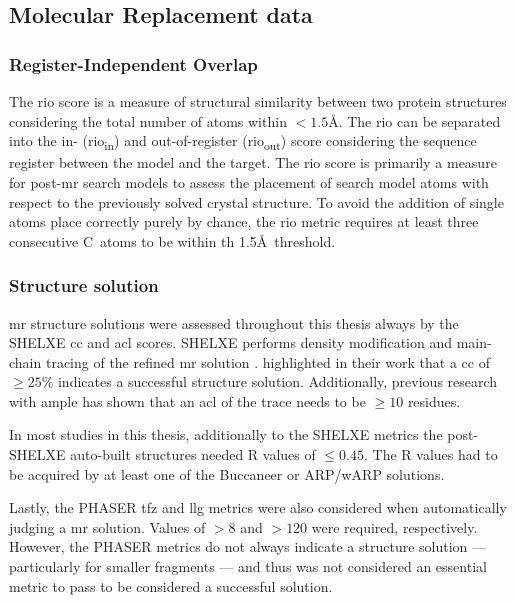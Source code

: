 \subsection{Molecular Replacement data}
\subsubsection{Register-Independent Overlap}
The \gls{rio} score \cite{Thomas2015-wu} is a measure of structural similarity between two protein structures considering the total number of atoms within $<1.5$\AA. The \gls{rio} can be separated into the in- (\gls{rio}\textsubscript{in}) and out-of-register (\gls{rio}\textsubscript{out}) score considering the sequence register between the model and the target. The \gls{rio} score is primarily a measure for post-\gls{mr} search models to assess the placement of search model atoms with respect to the previously solved crystal structure. To avoid the addition of single atoms place correctly purely by chance, the \gls{rio} metric requires at least three consecutive C\textalpha\ atoms to be within th 1.5\AA\ threshold.

\subsubsection{Structure solution} \label{sec:methods_mr_success}

\gls{mr} structure solutions were assessed throughout this thesis always by the SHELXE \gls{cc} and \gls{acl} scores. SHELXE performs density modification and main-chain tracing of the refined \gls{mr} solution \cite{Thorn2013-le}. \textcite{Thorn2013-le} highlighted in their work that a \gls{cc} of $\geq25$\% indicates a successful structure solution. Additionally, previous research with \gls{ample} \cite{Thomas2015-wu} has shown that an \gls{acl} of the trace needs to be $\geq10$ residues.

In most studies in this thesis, additionally to the SHELXE metrics the post-SHELXE auto-built structures needed R values of $\leq0.45$. The R values had to be acquired by at least one of the Buccaneer \cite{Cowtan2006-xv} or ARP/wARP \cite{Cohen2007-wg} solutions.

Lastly, the PHASER \gls{tfz} and \gls{llg} metrics were also considered when automatically judging a \gls{mr} solution. Values of $>8$ and $>120$ were required, respectively. However, the PHASER metrics do not always indicate a structure solution --- particularly for smaller fragments --- and thus was not considered an essential metric to pass to be considered a successful solution.
